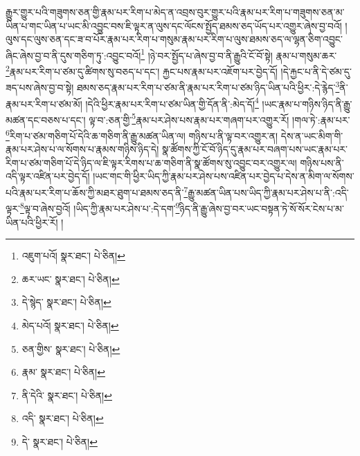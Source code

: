 རྒྱུར་གྱུར་པའི་གཟུགས་ཅན་གྱི་རྣམ་པར་རིག་པ་མེད་ན་འབྲས་བུར་གྱུར་པའི་རྣམ་པར་རིག་པ་གཟུགས་ཅན་མ་ཡིན་པ་གང་ཡིན་པ་ཡང་མི་འབྱུང་བས་ཇི་ལྟར་ན་ལུས་དང་ལོངས་སྤྱོད་ཐམས་ཅད་ཡོད་པར་འགྱུར་ཞེས་བྱ་བའོ། །ལུས་དང་ལུས་ཅན་དང་ཟ་བ་པོར་རྣམ་པར་རིག་པ་གསུམ་རྣམ་པར་རིག་པ་ལུས་ཐམས་ཅད་ལ་ལྷན་ཅིག་འབྱུང་ཞིང་ཞེས་བྱ་བ་ནི་དུས་གཅིག་ཏུ་:འབྱུང་བའོ།\footnote{འཇུག་པའོ།  སྣར་ཐང་།  པེ་ཅིན། } །ཉེ་བར་སྤྱོད་པ་ཞེས་བྱ་བ་ནི་རྒྱུའི་ངོ་བོ་སྟེ། རྣམ་པ་གསུམ་ཆར་\footnote{ཆར་ཡང་  སྣར་ཐང་།  པེ་ཅིན། }རྣམ་པར་རིག་པ་ཙམ་དུ་ཚིགས་སུ་བཅད་པ་དང་། རྐྱང་པས་རྣམ་པར་འཇོག་པར་བྱེད་དོ། །དེ་རྐྱང་པ་ནི་དེ་ཙམ་དུ་ཟད་པས་ཞེས་བྱ་བ་སྟེ། ཐམས་ཅད་རྣམ་པར་རིག་པ་ཙམ་ནི་རྣམ་པར་རིག་པ་ཙམ་ཉིད་ཡིན་པའི་ཕྱིར་:དེ་རྙེད་\footnote{དེ་སྙེད་  སྣར་ཐང་།  པེ་ཅིན། }ནི་རྣམ་པར་རིག་པ་ཙམ་མོ། །དེའི་ཕྱིར་རྣམ་པར་རིག་པ་ཙམ་ཡིན་གྱི་དོན་ནི་:མེད་དོ།\footnote{མེད་པའོ།  སྣར་ཐང་།  པེ་ཅིན། } །ཡང་རྣམ་པ་གཉིས་ཉིད་ནི་རྒྱུ་མཚན་དང་བཅས་པ་དང་། ལྟ་བ་:ཅན་གྱི་\footnote{ཅན་གྱིས་  སྣར་ཐང་།  པེ་ཅིན། }རྣམ་པར་ཤེས་པས་རྣམ་པར་གཞག་པར་འགྱུར་རོ། །གལ་ཏེ་:རྣམ་པར་\footnote{རྣམ་  སྣར་ཐང་།  པེ་ཅིན། }རིག་པ་ཙམ་གཅིག་པོ་དེའི་ཆ་གཅིག་ནི་རྒྱུ་མཚན་ཡིན་ལ། གཉིས་པ་ནི་ལྟ་བར་འགྱུར་ན། དེས་ན་ཡང་མིག་གི་རྣམ་པར་ཤེས་པ་ལ་སོགས་པ་རྣམས་གཉིས་ཉིད་དེ། སྣ་ཚོགས་ཀྱི་ངོ་བོ་ཉིད་དུ་རྣམ་པར་བཞག་པས་ཡང་རྣམ་པར་རིག་པ་ཙམ་གཅིག་པོ་དེ་ཉིད་ལ་ཇི་ལྟར་རིགས་པ་ཆ་གཅིག་ནི་སྣ་ཚོགས་སུ་འབྱུང་བར་འགྱུར་ལ། གཉིས་པས་ནི་འདི་ལྟར་འཛིན་པར་བྱེད་དོ། །ཡང་གང་གི་ཕྱིར་ཡིད་ཀྱི་རྣམ་པར་ཤེས་པས་འཛིན་པར་བྱེད་པ་དེས་ན་མིག་ལ་སོགས་པའི་རྣམ་པར་རིག་པ་ཆོས་ཀྱི་མཐར་ཐུག་པ་ཐམས་ཅད་ནི་\footnote{ནི་དེའི་  སྣར་ཐང་།  པེ་ཅིན། }རྒྱུ་མཚན་ཡིན་པས་ཡིད་ཀྱི་རྣམ་པར་ཤེས་པ་ནི་:འདི་ལྟར་\footnote{འདི་  སྣར་ཐང་།  པེ་ཅིན། }ལྟ་བ་ཞེས་བྱའོ། །ཡིད་ཀྱི་རྣམ་པར་ཤེས་པ་:དེ་དག་\footnote{དེ་  སྣར་ཐང་།  པེ་ཅིན། }ཉིད་ནི་རྒྱུ་ཞེས་བྱ་བར་ཡང་བསྟན་ཏེ་སོ་སོར་ངེས་པ་མ་ཡིན་པའི་ཕྱིར་རོ། །

